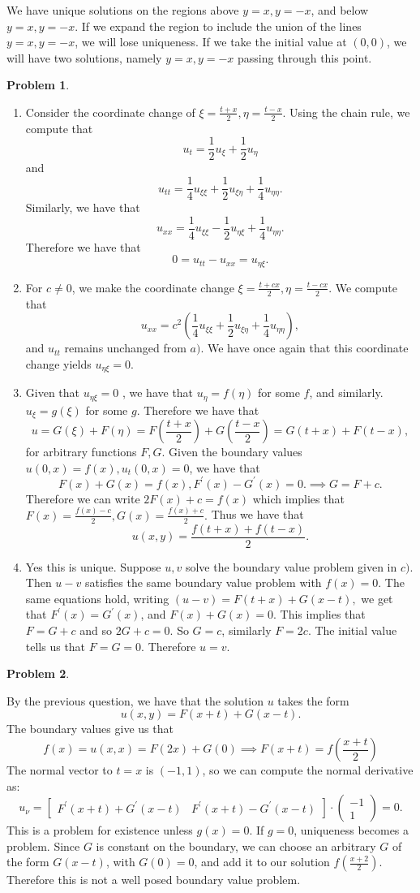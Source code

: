\documentclass[12pt, a4paper]{article}
\newtheorem{problem}{Problem}
\theoremstyle{definition}
\newcommand{\penum}{ \begin{enumerate}[label=\bf(\alph*), leftmargin=0pt]}
\newcommand{\epenum}{ \end{enumerate} }
\newcommand{\bmat}[1]{\begin{bmatrix}#1\end{bmatrix}}
\newcommand{\pmat}[1]{\begin{pmatrix}#1\end{pmatrix}}
\begin{document}
We have unique solutions on the regions above $y=x, y= -x$, and below $y=x, y=-x$. If we expand the region to include the union of the lines $y=x, y=-x$, we will lose uniqueness. If we take the initial value at $(0,0)$, we will have two solutions, namely $y=x,y=-x$ passing through this point. 
 \newpage 
\begin{problem}
\end{problem}
\penum
\item Consider the coordinate change of $\xi = \frac{t+x}{2} , \eta = \frac{t-x}{2}$. Using the chain rule, we compute that $$u_t =\frac{1}{2} u_\xi +  \frac{1}{2} u_\eta $$ and $$u_{tt} =\frac{1}{4} u_{\xi \xi} + \frac{1}{2} u_{\xi \eta} + \frac{1}{4} u_{\eta \eta}. $$
Similarly, we have that $$u_{xx} = \frac{1}{4} u_{\xi \xi } - \frac{1}{2} u_{\eta \xi} + \frac{1}{4} u_{\eta \eta}.$$
Therefore we have that $$0 = u_{tt} - u_{xx} = u_{\eta \xi}.$$
\item For $c\neq 0$, we make the coordinate change $\xi = \frac{t+c x}{2} , \eta = \frac{t-cx}{2}$.	We compute that $$u_{xx} = c^2 \left(\frac{1}{4} u_{\xi \xi } + \frac{1}{2} u_{\xi \eta} + \frac{1}{4} u_{\eta\eta}   \right),$$
	and $u_{tt} $ remains unchanged from $a)$. We have once again that this coordinate change yields $u_{\eta \xi}=0$. 
\item Given that $u_{\eta \xi}=0$ , we have that $u_\eta = f(\eta)$ for some $f$, and similarly. $u_\xi = g(\xi)$ for some $g$. Therefore we have that $$u = G(\xi) + F(\eta) = F\left(\frac{t+x}{2}\right) + G\left(\frac{t-x}{2}\right) = G(t+x) + F(t-x), $$
for arbitrary functions $F,G$. 
Given the boundary values $u(0,x) = f(x), u_t(0,x) = 0$, we have that $$F(x) + G(x)= f(x) , F^\prime (x) -G^\prime(x) = 0. \implies G = F+c.$$
Therefore we can write $2F(x) + c = f(x)$ which implies that $F(x) = \frac{f(x) -c}{2}, G(x) = \frac{f(x)+ c}{2}. $  Thus we have that $$u(x,y) = \frac{f(t+x) + f(t-x)}{2}.$$ 
\item 
	Yes this is unique. Suppose $u,v$ solve the boundary value problem given in $c)$.
Then $u-v$ satisfies the same boundary value problem with $f(x) =0$. The same equations hold, writing $(u-v) = F(t+x) + G(x-t), $ we get that $F^\prime(x) = G^\prime(x)$, and $F(x) + G(x) = 0$. This implies that $F = G+c$ and so $2G + c = 0$. So $G = c$, similarly $F = 2c$. The initial value tells us that $F=G = 0$. Therefore $u=v$. 
\epenum
 \newpage 
\begin{problem}
\end{problem}
By the previous question, we have that the solution $u$ takes the form
$$u(x,y) = F(x+t) + G(x-t). $$
The boundary values give us that $$f(x) = u(x,x) =F(2x) + G(0)\implies F(x+t) = f \left(\frac{x+t}{2}\right) $$
The normal vector to $t=x$ is $(-1,1)$, so we can compute the normal derivative as: 
$$u_\nu = \bmat{F^\prime(x+t) + G^\prime(x-t) & F^\prime(x+t) - G^\prime(x-t)} \cdot \pmat{-1 \\ 1} =0.$$
This is a problem for existence unless $g(x) = 0$. If $g=0$, uniqueness becomes a problem. Since $G$ is constant on the boundary, we can choose an arbitrary $G$ of the form $G(x-t)$, with $G(0)=0$, and add it to our solution $f \left( \frac{x+2}{2} \right)$. Therefore this is not a well posed boundary value problem. 
\end{document}
